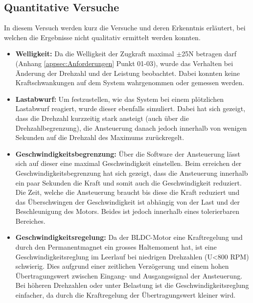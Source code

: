 \subsection{Quantitative Versuche}\label{subsec:Quantitative}
In diesem Versuch werden kurz die Versuche und deren Erkenntnis erläutert, bei welchen die Ergebnisse nicht qualitativ ermittelt werden konnten.
\begin{itemize}
	\item \textbf{Welligkeit:} Da die Welligkeit der Zugkraft maximal $\pm$25N betragen darf (Anhang \ref{appsec:Anforderungen} Punkt 01-03), wurde das Verhalten bei Änderung der Drehzahl und der Leistung beobachtet. Dabei konnten keine Kraftschwankungen auf dem System wahrgenommen oder gemessen werden.
	\item \textbf{Lastabwurf:} Um festzustellen, wie das System bei einem plötzlichen Lastabwurf reagiert, wurde dieser ebenfalls simuliert. Dabei hat sich gezeigt, dass die Drehzahl kurzzeitig stark ansteigt (auch über die Drehzahlbegrenzung), die Ansteuerung danach jedoch innerhalb von wenigen Sekunden auf die Drehzahl des Maximums zurückregelt.
	\item \textbf{Geschwindigkeitsbegrenzung: } Über die Software der Ansteuerung lässt sich auf dieser eine maximal Geschwindigkeit einstellen. Beim erreichen der Geschwindigkeitsbegrenzung hat sich gezeigt, dass die Ansteuerung innerhalb ein paar Sekunden die Kraft und somit auch die Geschwindigkeit reduziert. Die Zeit, welche die Ansteuerung braucht bis diese die Kraft reduziert und das Überschwingen der Geschwindigkeit ist abhängig von der Last und der Beschleunigung des Motors. Beides ist jedoch innerhalb eines tolerierbaren Bereiches.
	\item \textbf{Geschwindigkeitsregelung:} Da der BLDC-Motor eine Kraftregelung und durch den Permanentmagnet ein grosses Haltemoment hat, ist eine Geschwindigkeitsreglung im Leerlauf bei niedrigen Drehzahlen (U<800 RPM) schwierig. Dies aufgrund einer zeitlichen Verzögerung und einem hohen Übertragungswert zwischen Eingang- und Ausgangssignal der Ansteuerung. Bei höheren Drehzahlen oder unter Belastung ist die Geschwindigkeitsreglung einfacher, da durch die Kraftregelung der Übertragungswert kleiner wird.
\end{itemize}